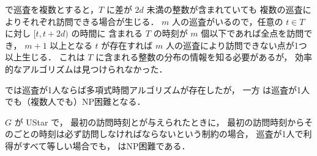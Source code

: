 \decisionpp で巡査を複数とすると，$T$ に差が $2d$ 未満の整数が含まれていても
複数の巡査によりそれぞれ訪問できる場合が生じる．
$m$ 人の巡査がいるので，任意の $t \in T$ に対し $[t, t + 2d)$ の時間に
含まれる $T$ の時刻が $m$ 個以下であれば全点を訪問でき，
$m + 1$ 以上となる $t$ が存在すれば $m$ 人の巡査により訪問できない点が1つ以上生じる．
これは $T$ に含まれる整数の分布の情報を知る必要があるが，
効率的なアルゴリズムは見つけられなかった．



\decisionpp では巡査が1人ならば多項式時間アルゴリズムが存在したが，
一方 \optpp は巡査が1人でも（複数人でも）NP困難となる．

\begin{theo}
	\label{theo:5_UStar_exact_starttime_NPhard}
	$G$ が UStar で，
	最初の訪問時刻と{\period}が与えられたときに，
	最初の訪問時刻からその{\period}ごとの時刻は必ず訪問しなければならないという制約の場合，
	巡査が1人で利得がすべて等しい場合でも，
	\optpp はNP困難である．
\end{theo}


